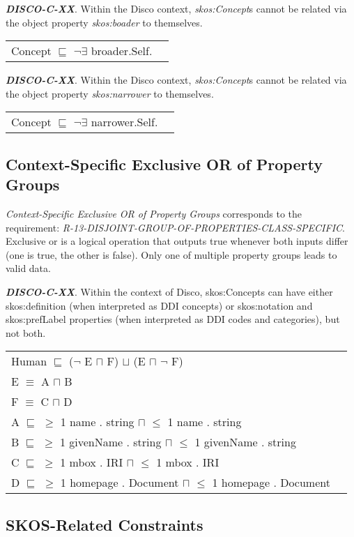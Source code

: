 \documentclass{elsart3p}    %
\newenvironment{DL}{
  \vspace{0cm}
  \begin{tabular}{l l}

}{
  \end{tabular}
}
\begin{document}
\textbf{{\em DISCO-C-XX}}.
Within the Disco context, {\em skos:Concept}s cannot be related via the object property {\em skos:boader} to themselves.

\begin{DL}
Concept $\sqsubseteq$ $\neg$$\exists$ broader.Self. 
\end{DL}

\textbf{{\em DISCO-C-XX}}.
Within the Disco context, {\em skos:Concept}s cannot be related via the object property {\em skos:narrower} to themselves. 

\begin{DL}
Concept $\sqsubseteq$ $\neg$$\exists$ narrower.Self. 
\end{DL}

\subsection{Context-Specific Exclusive OR of Property Groups}

{\em Context-Specific Exclusive OR of Property Groups} corresponds to the requirement:
{\em R-13-DISJOINT-GROUP-OF-PROPERTIES-CLASS-SPECIFIC}.
Exclusive or is a logical operation that outputs true whenever both inputs differ (one is true, the other is false).
Only one of multiple property groups leads to valid data.

\textbf{{\em DISCO-C-XX}}.
Within the context of Disco, skos:Concepts can have either skos:definition (when interpreted as DDI concepts) or skos:notation and skos:prefLabel properties (when interpreted as DDI codes and categories), but not both.

\begin{DL}
Human $\sqsubseteq$ ($\neg$ E $\sqcap$ F) $\sqcup$ (E $\sqcap$ $\neg$ F) \\ 
E $\equiv$ A $\sqcap$ B \\
F $\equiv$ C $\sqcap$ D \\
A $\sqsubseteq$ $\geq$ 1 name . string $\sqcap$ $\leq$ 1 name . string \\
B $\sqsubseteq$ $\geq$ 1 givenName . string $\sqcap$ $\leq$ 1 givenName . string \\
C $\sqsubseteq$ $\geq$ 1 mbox . IRI $\sqcap$ $\leq$ 1 mbox . IRI \\
D $\sqsubseteq$ $\geq$ 1 homepage . Document $\sqcap$ $\leq$ 1 homepage . Document \\
\end{DL}

\subsection{SKOS-Related Constraints}
\end{document}
